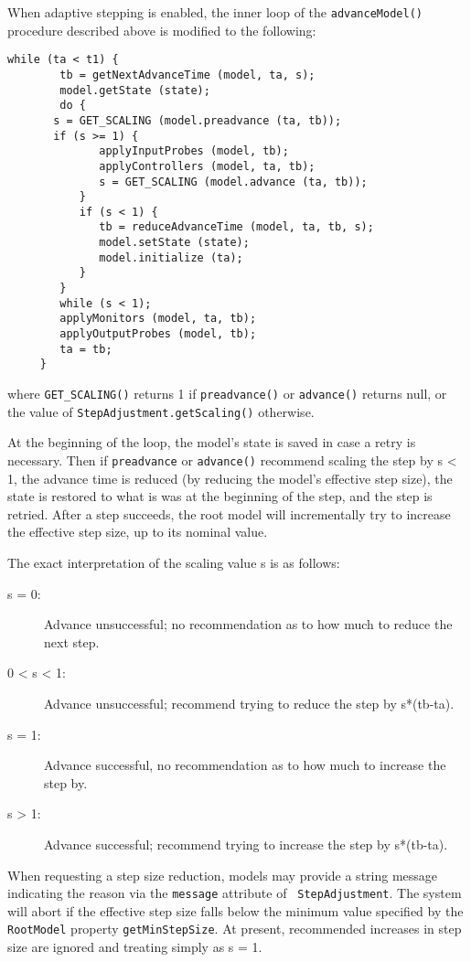 \documentclass{article}
\begin{document}
When adaptive stepping is enabled, the inner loop of the
{\tt advanceModel()} procedure described above is modified to the following:
\begin{lstlisting}[]
     while (ta < t1) {
        tb = getNextAdvanceTime (model, ta, s);
        model.getState (state);
        do {
	   s = GET_SCALING (model.preadvance (ta, tb));
	   if (s >= 1) {
              applyInputProbes (model, tb);
              applyControllers (model, ta, tb);
              s = GET_SCALING (model.advance (ta, tb));
           }
           if (s < 1) {
              tb = reduceAdvanceTime (model, ta, tb, s);
              model.setState (state);
              model.initialize (ta);
           }
        }
        while (s < 1);
        applyMonitors (model, ta, tb);
        applyOutputProbes (model, tb);
        ta = tb;
     }
\end{lstlisting}
where {\tt GET\_SCALING()} returns 1 if {\tt preadvance()} or
{\tt advance()} returns null, or the value of 
{\tt StepAdjustment.getScaling()} otherwise.

At the beginning of the loop, the model's state is saved in case a
retry is necessary. Then if {\tt preadvance{}} or {\tt advance()} recommend
scaling the step by s < 1, the advance time is
reduced (by reducing the model's effective step size), the state is
restored to what is was at the beginning of the step, and the step is
retried. After a step succeeds, the root model will
incrementally try to increase the effective step size, up to its
nominal value.

The exact interpretation of the scaling value s is
as follows:

\begin{description}
\item[s = 0:]
Advance unsuccessful; no recommendation as to how much to reduce the 
next step.

\item[0 < s < 1:]
Advance unsuccessful; recommend trying to reduce the step by s*(tb-ta).

\item[s = 1:]
Advance successful, no recommendation as to how much to increase the step by.

\item[s > 1:]
Advance successful; recommend trying to increase the step by s*(tb-ta).
\end{description}

When requesting a step size reduction, models may provide a string
message indicating the reason via the {\tt message} attribute of {\tt
StepAdjustment}.  The system will abort if the effective step size
falls below the minimum value specified by the {\tt RootModel}
property {\tt getMinStepSize}. At present, recommended increases in
step size are ignored and treating simply as s = 1.
\end{document}
